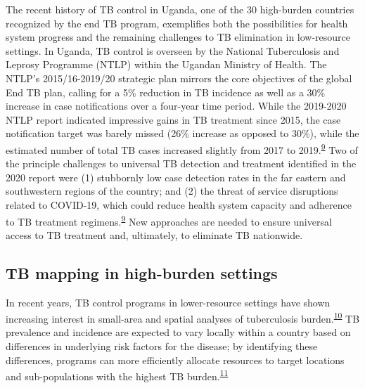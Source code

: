 \documentclass[
]{article}
\begin{document}
The recent history of TB control in Uganda, one of the 30 high-burden countries recognized by the end TB program, exemplifies both the possibilities for health system progress and the remaining challenges to TB elimination in low-resource settings. In Uganda, TB control is overseen by the National Tuberculosis and Leprosy Programme (NTLP) within the Ugandan Ministry of Health. The NTLP's 2015/16-2019/20 strategic plan mirrors the core objectives of the global End TB plan, calling for a 5\% reduction in TB incidence as well as a 30\% increase in case notifications over a four-year time period. While the 2019-2020 NTLP report indicated impressive gains in TB treatment since 2015, the case notification target was barely missed (26\% increase as opposed to 30\%), while the estimated number of total TB cases increased slightly from 2017 to 2019.\textsuperscript{\protect\hyperlink{ref-UgandaNationalTuberculosisandLeprosyProgramme2020}{9}} Two of the principle challenges to universal TB detection and treatment identified in the 2020 report were (1) stubbornly low case detection rates in the far eastern and southwestern regions of the country; and (2) the threat of service disruptions related to COVID-19, which could reduce health system capacity and adherence to TB treatment regimens.\textsuperscript{\protect\hyperlink{ref-UgandaNationalTuberculosisandLeprosyProgramme2020}{9}} New approaches are needed to ensure universal access to TB treatment and, ultimately, to eliminate TB nationwide.

\hypertarget{tb-mapping-in-high-burden-settings}{%
\subsection{TB mapping in high-burden settings}\label{tb-mapping-in-high-burden-settings}}

In recent years, TB control programs in lower-resource settings have shown increasing interest in small-area and spatial analyses of tuberculosis burden.\textsuperscript{\protect\hyperlink{ref-Glaziou2018a}{10}} TB prevalence and incidence are expected to vary locally within a country based on differences in underlying risk factors for the disease; by identifying these differences, programs can more efficiently allocate resources to target locations and sub-populations with the highest TB burden.\textsuperscript{\protect\hyperlink{ref-Rood2019}{11}}
\end{document}
